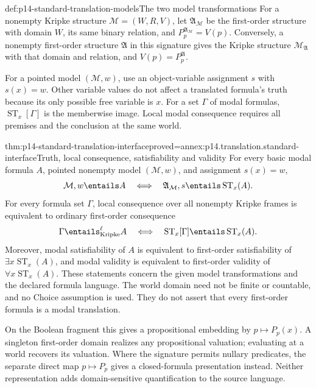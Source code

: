 \begin{hbdefinition}{def:p14-standard-translation-models}{The two model transformations}
For a nonempty Kripke structure \(\mathcal M=(W,R,V)\), let
\(\mathfrak A_{\mathcal M}\) be the first-order structure with domain
\(W\), its same binary relation, and
\(P_p^{\mathfrak A_{\mathcal M}}=V(p)\). Conversely, a nonempty
first-order structure \(\mathfrak A\) in this signature gives the Kripke
structure \(\mathcal M_{\mathfrak A}\) with that domain and relation,
and \(V(p)=P_p^{\mathfrak A}\).

For a pointed model \((\mathcal M,w)\), use an object-variable assignment
\(s\) with \(s(x)=w\). Other variable values do not affect a translated
formula's truth because its only possible free variable is \(x\).
For a set \(\Gamma\) of modal formulas,
\(\operatorname{ST}_x[\Gamma]\) is the memberwise image. Local modal
consequence requires all premises and the conclusion at the same world.
\end{hbdefinition}

\begin{hbtheorem}{thm:p14-standard-translation-interface}{proved=annex:p14.translation.standard-interface}{Truth, local consequence, satisfiability and validity}
For every basic modal formula \(A\), pointed nonempty model
\((\mathcal M,w)\), and assignment \(s(x)=w\),
\[
 \mathcal M,w\entails A
       \quad\Longleftrightarrow\quad
 \mathfrak A_{\mathcal M},s\entails\operatorname{ST}_x(A).
\]
For every formula set \(\Gamma\), local consequence over all nonempty
Kripke frames is equivalent to ordinary first-order consequence
\[
 \Gamma\entails^{\ell}_{\mathrm{Kripke}} A
       \quad\Longleftrightarrow\quad
 \operatorname{ST}_x[\Gamma]\entails\operatorname{ST}_x(A).
\]
Moreover, modal satisfiability of \(A\) is equivalent to first-order
satisfiability of \(\exists x\operatorname{ST}_x(A)\), and modal validity
is equivalent to first-order validity of
\(\forall x\operatorname{ST}_x(A)\). These statements concern the given
model transformations and the declared formula language. The world domain
need not be finite or countable, and no Choice assumption is used.
They do not assert that every first-order formula is a modal translation.
\end{hbtheorem}

On the Boolean fragment this gives a propositional embedding by
\(p\mapsto P_p(x)\). A singleton first-order domain realizes any
propositional valuation; evaluating at a world recovers its valuation.
Where the signature permits nullary predicates, the separate direct map
\(p\mapsto P_p\) gives a closed-formula presentation instead. Neither
representation adds domain-sensitive quantification to the source language.

